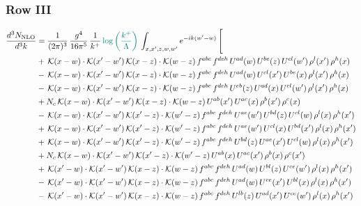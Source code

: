 \documentclass[9pt]{article}
\numberwithin{equation}{section}
\begin{document}
 \subsubsection{Row III}
 \begin{align}
\frac{d^{3}N_{\mathrm{NLO}}}{d^{3}k} & = \frac{1}{(2\pi)^{3}}\,\frac{g^{4}}{16\pi^{5}}\,\frac{1}{k^{+}}\,{\color{teal}\log{\left(\frac{k^{+}}{\Lambda}\right)}}\,\int_{x,x',z,w,w'}e^{-ik(w'-w)}\,\Bigg[\notag\\ &  +\,\mathcal{K}(x-w)\cdot\mathcal{K}(x'-w')\,\mathcal{K}(x-z)\cdot\mathcal{K}(w-z)\,f^{abc}\,f^{deh}\,U^{ad}(w)\,U^{be}(z)\,U^{cl}(w')\,\rho^{l}(x')\,\rho^{h}(x)\notag\\
& -\,\mathcal{K}(x-w)\cdot\mathcal{K}(x'-w')\,\mathcal{K}(x-z)\cdot\mathcal{K}(w-z)\,f^{abc}\,f^{deh}\,U^{ad}(w)\,U^{cl}(x')\,U^{be}(x)\,\rho^{l}(x')\,\rho^{h}(x)\notag\\
& -\,\mathcal{K}(x-w)\cdot\mathcal{K}(x'-w')\,\mathcal{K}(x-z)\cdot\mathcal{K}(w-z)\,f^{abc}\,f^{deh}\,U^{eb}(z)\,U^{ad}(x)\,U^{cl}(w')\,\rho^{l}(x')\,\rho^{h}(x)\notag\\
& +N_{c}\,\mathcal{K}(x-w)\cdot\mathcal{K}(x'-w')\,\mathcal{K}(x-z)\cdot\mathcal{K}(w-z)\,U^{ab}(x')\,U^{ac}(x)\,\rho^{b}(x')\,\rho^{c}(x)\notag\\
& -\,\mathcal{K}(x-w)\cdot\mathcal{K}(x'-w')\,\mathcal{K}(x'-z)\cdot\mathcal{K}(w'-z)\,f^{abc}\,f^{deh}\,U^{ae}(w')\,U^{bd}(z)\,U^{cl}(w)\,\rho^{l}(x)\,\rho^{h}(x')\notag\\
& +\,\mathcal{K}(x-w)\cdot\mathcal{K}(x'-w')\,\mathcal{K}(x'-z)\cdot\mathcal{K}(w'-z)\,f^{abc}\,f^{deh}\,U^{ae}(w')\,U^{cl}(x)\,U^{bd}(x')\,\rho^{l}(x)\,\rho^{h}(x')\notag\\
& +\,\mathcal{K}(x-w)\cdot\mathcal{K}(x'-w')\,\mathcal{K}(x'-z)\cdot\mathcal{K}(w'-z)\,f^{abc}\,f^{deh}\,U^{bd}(z)\,U^{ae}(x')\,U^{cl}(w)\,\rho^{l}(x)\,\rho^{h}(x')\notag\\
& +N_{c}\,\mathcal{K}(x-w)\cdot\mathcal{K}(x'-w')\,\mathcal{K}(x'-z)\cdot\mathcal{K}(w'-z)\,U^{ab}(x)\,U^{ac}(x')\,\rho^{b}(x)\,\rho^{c}(x')\notag\\
& +\,\mathcal{K}(x'-w)\cdot\mathcal{K}(x'-w')\,\mathcal{K}(x-z)\cdot\mathcal{K}(w-z)\,f^{abc}\,f^{deh}\,U^{ad}(w)\,U^{bl}(z)\,U^{ce}(w')\,\rho^{l}(x)\,\rho^{h}(x')\notag\\
& -\,\mathcal{K}(x'-w)\cdot\mathcal{K}(x'-w')\,\mathcal{K}(x-z)\cdot\mathcal{K}(w-z)\,f^{abc}\,f^{deh}\,U^{ad}(w)\,U^{ce}(x')\,U^{bl}(x)\,\rho^{l}(x)\,\rho^{h}(x')\notag\\
& -\,\mathcal{K}(x'-w)\cdot\mathcal{K}(x'-w')\,\mathcal{K}(x-z)\cdot\mathcal{K}(w-z)\,f^{abc}\,f^{deh}\,U^{lb}(z)\,U^{ad}(x')\,U^{ce}(w')\,\rho^{l}(x)\,\rho^{h}(x')\notag\\

\end{align}
\end{document}
